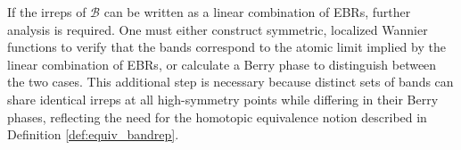 If the irreps of \(\mathcal{B}\) can be written as a linear combination of EBRs, further analysis is required. One must either construct symmetric, localized Wannier functions to verify that the bands correspond to the atomic limit implied by the linear combination of EBRs, or calculate a Berry phase to distinguish between the two cases. This additional step is necessary because distinct sets of bands can share identical irreps at all high-symmetry points while differing in their Berry phases, reflecting the need for the homotopic equivalence notion described in Definition \ref{def:equiv_bandrep}.




%



